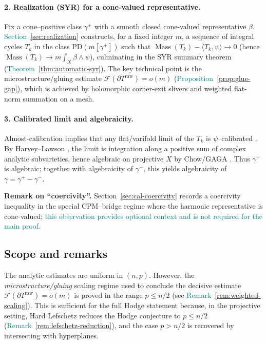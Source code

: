 \documentclass[11pt]{article}
\newcommand{\REVMZ}[1]{\textcolor{teal}{#1}}  %
\numberwithin{equation}{section}  %
\theoremstyle{plain}
\theoremstyle{definition}
\theoremstyle{remark}
\DeclareMathOperator{\Mass}{Mass}
\begin{document}
\paragraph{2. Realization (SYR) for a cone-valued representative.}
Fix a cone--positive class $\gamma^+$ with a smooth closed cone-valued representative $\beta$.
\REVMZ{Section~\ref{sec:realization}} constructs, for a fixed integer $m$, a sequence of integral cycles $T_k$
in the class $\mathrm{PD}(m[\gamma^+])$ such that $\Mass(T_k)-\langle T_k,\psi\rangle\to 0$ (hence $\Mass(T_k)\to m\int_X\beta\wedge\psi$), culminating in the SYR summary theorem (\REVMZ{Theorem~\ref{thm:automatic-syr}}).
The key technical point is the microstructure/gluing estimate $\mathcal F(\partial T^{\mathrm{raw}})=o(m)$ (\REVMZ{Proposition~\ref{prop:glue-gap}}),
which is achieved by holomorphic corner-exit slivers and weighted flat-norm summation on a mesh.

\paragraph{3. Calibrated limit and algebraicity.}
Almost-calibration implies that any flat/varifold limit of the $T_k$ is $\psi$--calibrated \REVMZ{\cite{HL82}}.
By Harvey--Lawson \REVMZ{\cite{King71,HL82}}, the limit is integration along a positive sum of complex analytic subvarieties, hence algebraic on projective $X$ by Chow/GAGA \REVMZ{\cite{Chow49,Serre56}}.
Thus $\gamma^+$ is algebraic; together with algebraicity of $\gamma^-$, this yields algebraicity of $\gamma=\gamma^+-\gamma^-$.

\smallskip\noindent\textbf{Remark on ``coercivity''.} Section~\ref{sec:cal-coercivity} records a coercivity inequality in the special CPM--bridge regime where the harmonic representative is cone-valued;
\REVMZ{this observation provides optional context and is not required for the main proof.}


\subsection*{Scope and remarks}


The analytic estimates are uniform in $(n,p)$.
However, the \emph{microstructure/gluing} scaling regime used to conclude the decisive estimate
$\mathcal F(\partial T^{\mathrm{raw}})=o(m)$ is proved in the range $p\le n/2$
(see \REVMZ{Remark~\ref{rem:weighted-scaling}}).
This is sufficient for the full Hodge statement because, in the projective setting, Hard Lefschetz reduces the Hodge conjecture to $p\le n/2$
(\REVMZ{Remark~\ref{rem:lefschetz-reduction}}), and the case $p>n/2$ is recovered by intersecting with hyperplanes.
\end{document}
